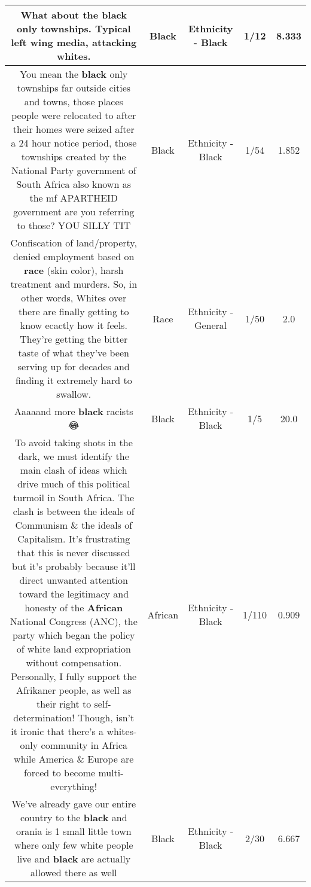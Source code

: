 \documentclass[11pt]{article}
\newlength\mylength
\begin{document}
\begin{center}
\begin{longtable}{|C{.65\mylength}|C{.30\mylength}|C{.12\mylength}|C{.12\mylength}|C{.12\mylength}|}
  \small What about the \textbf{black} only townships. Typical left wing media, attacking whites.\normalsize   & Black & Ethnicity - Black & 1/12 & 8.333 \\  \hline
  \small You mean the \textbf{black} only townships far outside cities and towns, those places people were relocated to after their homes were seized after a 24 hour notice period, those townships created by the National Party government of South Africa also known as the mf APARTHEID government are you referring to those? YOU SILLY TIT\normalsize   & Black & Ethnicity - Black & 1/54 & 1.852 \\  \hline
  \small Confiscation of land/property, denied employment based on \textbf{race} (skin color), harsh treatment and murders.  So, in other words, Whites over there are finally getting to know ecactly how it feels.  They're getting the bitter taste of what they've been serving up for decades and finding it extremely hard to swallow.\normalsize   & Race & Ethnicity - General & 1/50 & 2.0 \\  \hline
  \small Aaaaand more \textbf{black} racists 😂\normalsize   & Black & Ethnicity - Black & 1/5 & 20.0 \\  \hline
  \small To avoid taking shots in the dark, we must identify the main clash of ideas which drive much of this political turmoil in South Africa.  The clash is between the ideals of Communism \& the ideals of Capitalism.  It's frustrating that this is never discussed but it's probably because it'll direct unwanted attention toward the legitimacy and honesty of the \textbf{African} National Congress (ANC), the party which began the policy of white land expropriation without compensation.  Personally, I fully support the Afrikaner people, as well as their right to self-determination!  Though, isn't it ironic that there's a whites-only community in Africa while America \& Europe are forced to become multi-everything!\normalsize   & African & Ethnicity - Black & 1/110 & 0.909 \\  \hline
  \small We've already gave our entire country to the \textbf{black} and  orania is 1 small little town where only few white people live and \textbf{black} are actually allowed there as well\normalsize   & Black & Ethnicity - Black & 2/30 & 6.667 \\  \hline

\end{longtable}
\end{center}
\end{document}
